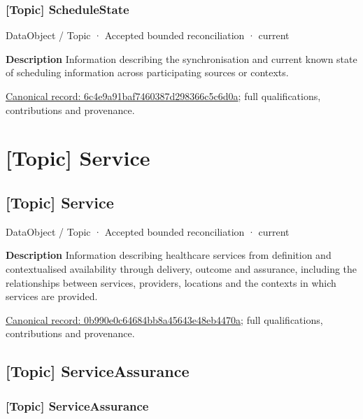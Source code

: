 \subsubsection{[Topic] ScheduleState}

\label{element:6c4e9a91baf7460387d298366c5c6d0a}
{\small DataObject / Topic · Accepted bounded reconciliation · current}\par

\textbf{Description}
Information describing the synchronisation and current known state of scheduling information across participating sources or contexts.


{\footnotesize \href{../../../../continuum/application/data-object/topic/6c4e9a91baf7460387d298366c5c6d0a.md}{Canonical record: 6c4e9a91baf7460387d298366c5c6d0a}; full qualifications, contributions and provenance.}\par
\section{[Topic] Service}

\subsection{[Topic] Service}

\label{element:0b990e0c64684bb8a45643e48eb4470a}
{\small DataObject / Topic · Accepted bounded reconciliation · current}\par

\textbf{Description}
Information describing healthcare services from definition and contextualised availability through delivery, outcome and assurance, including the relationships between services, providers, locations and the contexts in which services are provided.


{\footnotesize \href{../../../../continuum/application/data-object/topic/0b990e0c64684bb8a45643e48eb4470a.md}{Canonical record: 0b990e0c64684bb8a45643e48eb4470a}; full qualifications, contributions and provenance.}\par
\subsection{[Topic] ServiceAssurance}

\subsubsection{[Topic] ServiceAssurance}

